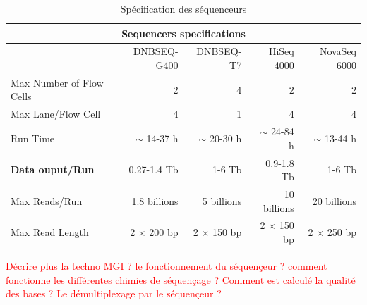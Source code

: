 \begin{table}[H]
\begin{tabular}{ |p{5cm}||r|r|r|r| }
    \hline
    \multicolumn{5}{|c|}{Sequencers specifications} \\\hline
    & \footnotesize{DNBSEQ-G400} & \footnotesize{DNBSEQ-T7} & \footnotesize{HiSeq 4000} & \footnotesize{NovaSeq 6000} \\\hline\hline
    Max Number of Flow Cells & 2 & 4 & 2 & 2 \\\hline
    Max Lane/Flow Cell & 4 & 1 & 4 & 4 \\\hline
    Run Time & $\sim$ 14-37 h & $\sim$ 20-30 h & $\sim$ 24-84 h & $\sim$ 13-44 h \\\hline
    \textbf{Data ouput/Run} & 0.27-1.4 Tb & 1-6 Tb & 0.9-1.8 Tb & 1-6 Tb \\\hline
    Max Reads/Run & 1.8 billions & 5 billions & 10 billions & 20 billions \\\hline
    Max Read Length & 2 $\times$ 200 bp & 2 $\times$ 150 bp & 2 $\times$ 150 bp & 2 $\times$ 250 bp \\\hline
\end{tabular}
    \caption{Spécification des séquenceurs}
    \label{spe-seq}
\end{table}

\textcolor{red}{Décrire plus la techno MGI ? le fonctionnement du séquençeur ? comment fonctionne les différentes chimies de séquençage ?
Comment est calculé la qualité des bases ? Le démultiplexage par le séquençeur ?}